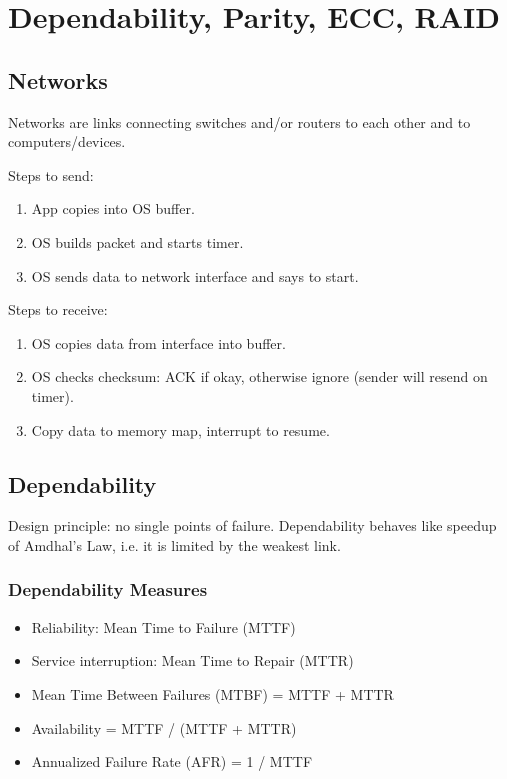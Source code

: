 \chapter{Dependability, Parity, ECC, RAID}

\section{Networks}
Networks are links connecting switches and/or routers to each other and to computers/devices.

\medskip

Steps to send:
\begin{enumerate}
	\item App copies into OS buffer.
	\item OS builds packet and starts timer.
	\item OS sends data to network interface and says to start.
\end{enumerate}

Steps to receive:
\begin{enumerate}
	\item OS copies data from interface into buffer.
	\item OS checks checksum: ACK if okay, otherwise ignore (sender will resend on timer).
	\item Copy data to memory map, interrupt to resume.
\end{enumerate}

\section{Dependability}
Design principle: no single points of failure. Dependability behaves like speedup of Amdhal's Law, i.e. it is limited by the weakest link.

\subsection{Dependability Measures}
\begin{itemize}
    \item Reliability: Mean Time to Failure (MTTF)
    \item Service interruption: Mean Time to Repair (MTTR)
    \item Mean Time Between Failures (MTBF) = MTTF + MTTR
    \item Availability = MTTF / (MTTF + MTTR)
    \item Annualized Failure Rate (AFR) = 1 / MTTF
\end{itemize}

